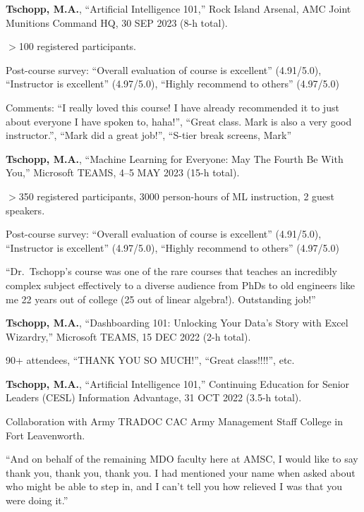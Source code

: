 \begin{cvlist}
\item
\textbf{Tschopp, M.A.}, ``Artificial Intelligence 101,'' Rock Island Arsenal, AMC Joint Munitions Command HQ, 30 SEP 2023 (8-h total).
\begin{list2}
\item[$\star$] $>$100 registered participants.
\item[$\star$] Post-course survey: ``Overall evaluation of course is excellent'' (4.91/5.0), ``Instructor is excellent'' (4.97/5.0), ``Highly recommend to others'' (4.97/5.0)
\item[$\star$] Comments: ``I really loved this course! I have already recommended it to just about everyone I have spoken to, haha!'', ``Great class. Mark is also a very good instructor.'', ``Mark did a great job!'', ``S-tier break screens, Mark''
\end{list2}

\item
\textbf{Tschopp, M.A.}, ``Machine Learning for Everyone: May The Fourth Be With You,'' Microsoft TEAMS, 4--5 MAY 2023 (15-h total).
\begin{list2}
\item[$\star$] $>$350 registered participants, 3000 person-hours of ML instruction, 2 guest speakers.
\item[$\star$] Post-course survey: ``Overall evaluation of course is excellent'' (4.91/5.0), ``Instructor is excellent'' (4.97/5.0), ``Highly recommend to others'' (4.97/5.0)
\item[$\star$] ``Dr.~Tschopp's course was one of the rare courses that teaches an incredibly complex subject effectively to a diverse audience from PhDs to old engineers like me 22 years out of college (25 out of linear algebra!).  Outstanding job!''
\end{list2}

\item
\textbf{Tschopp, M.A.}, ``Dashboarding 101: Unlocking Your Data's Story with Excel Wizardry,'' Microsoft TEAMS, 15 DEC 2022 (2-h total).
\begin{list2}
\item[$\star$] 90+ attendees, ``THANK YOU SO MUCH!'', ``Great class!!!!'', etc.
\end{list2}

\item
\textbf{Tschopp, M.A.}, ``Artificial Intelligence 101,'' Continuing Education for Senior Leaders (CESL) Information Advantage, 31 OCT 2022 (3.5-h total).
\begin{list2}
\item[$\star$] Collaboration with Army TRADOC CAC Army Management Staff College in Fort Leavenworth.
\item[$\star$] ``And on behalf of the remaining MDO faculty here at AMSC, I would like to say thank you, thank you, thank you. I had mentioned your name when asked about who might be able to step in, and I can't tell you how relieved I was that you were doing it.''
\end{list2}


\end{cvlist}
